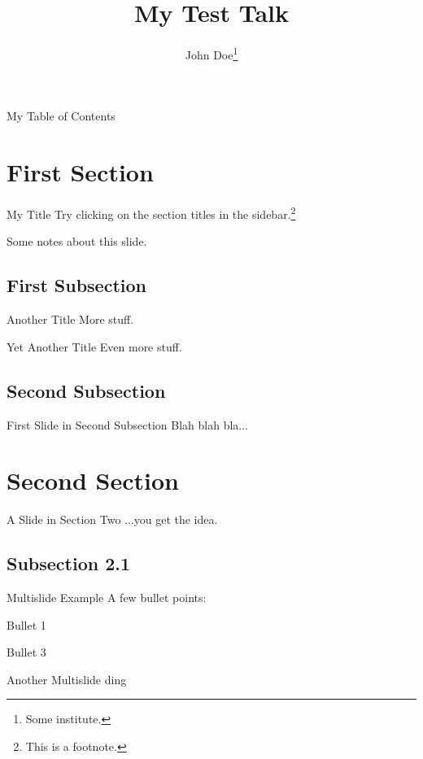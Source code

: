 \documentclass[12pt,slides]{talk}
\title{My Test Talk}
\author[John Doe]{John Doe\thanks{Some institute.}}
\begin{document}
\begin{slide}[plain]{}
  \maketitle
\end{slide}

\begin{slide}[outline]{My Table of Contents}
  \tableofcontents
\end{slide}

\section{First Section}

\begin{slide}{My Title}
  Try clicking on the section titles in the sidebar.\footnote{This is a
  footnote.}
\end{slide}
\begin{notes}
  Some notes about this slide.
\end{notes}

\subsection{First Subsection}
\begin{slide}{Another Title}
  More stuff.
\end{slide}
\begin{slide}{Yet Another Title}
  Even more stuff.
\end{slide}

\subsection{Second Subsection}
\begin{slide}{First Slide in Second Subsection}
  Blah blah bla...
\end{slide}

\section{Second Section}

\begin{slide}{A Slide in Section Two}
  ...you get the idea.
\end{slide}

\subsection{Subsection 2.1}
\begin{multislide}{3}{Multislide Example}
  A few bullet points:
  \begin{itemize}
  \item Bullet 1
  {\item Bullet 3}
  \end{itemize}
\end{multislide}

\begin{multislide}{2}{Another Multislide}
  ding 
\end{multislide}
\end{document}
